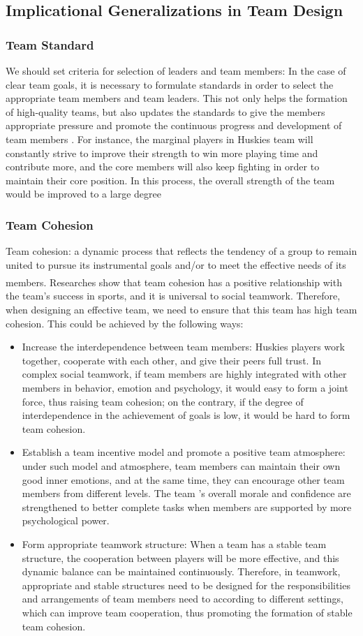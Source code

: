 \documentclass{mcmthesis}
\newcommand{\upcite}[1]{\textsuperscript{\textsuperscript{\cite{#1}}}}
\begin{document}
\subsection{Implicational Generalizations in Team Design}
\subsubsection{Team Standard}

We should set criteria for selection of leaders and team members: In the case of clear team goals, it is necessary to formulate standards in order to select the appropriate team members and team leaders. This not only helps the formation of high-quality teams, but also updates the standards to give the members appropriate pressure and promote the continuous progress and development of team members . For instance, the marginal players in Huskies team will constantly strive to improve their strength to win more playing time and contribute more, and the core members will also keep fighting in order to maintain their core position. In this process, the overall strength of the team would be improved to a large degree
\subsubsection{Team Cohesion}
Team cohesion: a dynamic process that reflects the tendency of a group to remain united to pursue its instrumental goals and/or to meet the effective needs of its members\upcite{3}. Researches show that team cohesion has a positive relationship with the team's success in sports, and it is universal to social teamwork. Therefore, when designing an effective team, we need to ensure that this team has high team cohesion. This could be achieved by the following ways:
\begin{itemize}
    \item Increase the interdependence between team members: Huskies players work together, cooperate with each other, and give their peers full trust. In complex social teamwork, if team members are highly integrated with other members in behavior, emotion and psychology, it would easy to form a joint force, thus raising team cohesion; on the contrary, if the degree of interdependence in the achievement of goals is low, it would be hard to form team cohesion.
    \item Establish a team incentive model and promote a positive team atmosphere: under such model and atmosphere, team members can maintain their own good inner emotions, and at the same time, they can encourage other team members from different levels. The team ’s overall morale and confidence are strengthened to better complete tasks when members are supported by more psychological power.
    \item Form appropriate teamwork structure: When a team has a stable team structure, the cooperation between players will be more effective, and this dynamic balance can be maintained continuously. Therefore, in teamwork, appropriate and stable structures need to be designed for the responsibilities and arrangements of team members need to according to different settings, which can improve team cooperation, thus promoting the formation of stable team cohesion.
\end{itemize}
\end{document}
